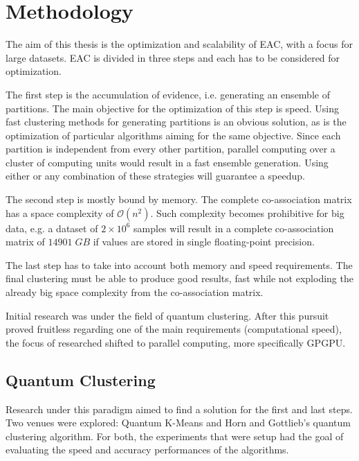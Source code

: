 
\chapter{Methodology}
\label{chapter:methodology}




The aim of this thesis is the optimization and scalability of EAC, with a focus for large datasets. EAC is divided in three steps and each has to be considered for optimization.

The first step is the accumulation of evidence, i.e. generating an ensemble of partitions. The main objective for the optimization of this step is speed. Using fast clustering methods for generating partitions is an obvious solution, as is the optimization of particular algorithms aiming for the same objective. Since each partition is independent from every other partition, parallel computing over a cluster of computing units would result in a fast ensemble generation. Using either or any combination of these strategies will guarantee a speedup.


	
The second step is mostly bound by memory. The complete co-association matrix has a space complexity of $\mathcal{O}(n^2)$. Such complexity becomes prohibitive for big data, e.g. a dataset of $2 \times 10^6$ samples will result in a complete co-association matrix of $14901 \; GB$ if values are stored in single floating-point precision.

The last step has to take into account both memory and speed requirements. The final clustering must be able to produce good results, fast while not exploding the already big space complexity from the co-association matrix.

Initial research was under the field of quantum clustering. After this pursuit proved fruitless regarding one of the main requirements (computational speed), the focus of researched shifted to parallel computing, more specifically GPGPU. 

\section{Quantum Clustering}

Research under this paradigm aimed to find a solution for the first and last steps. Two venues were explored: Quantum K-Means and Horn and Gottlieb's quantum clustering algorithm.
For both, the experiments that were setup had the goal of evaluating the speed and accuracy performances of the algorithms.

